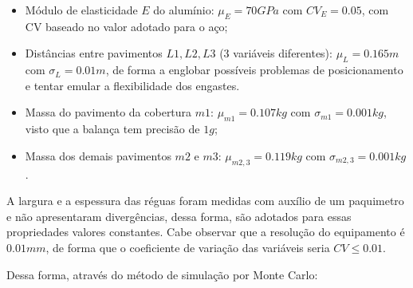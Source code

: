 \begin{itemize}
\item
  Módulo de elasticidade \(E\) do alumínio: \(\mu_E = 70 GPa\) com
  \(CV_E=0.05\), com CV baseado no valor adotado para o aço;
\item
  Distâncias entre pavimentos \(L1, L2, L3\) (3 variáveis diferentes):
  \(\mu_L = 0.165 m\) com \(\sigma_L = 0.01 m\), de forma a englobar
  possíveis problemas de posicionamento e tentar emular a flexibilidade
  dos engastes.
\item
  Massa do pavimento da cobertura \(m1\): \(\mu_{m1} = 0.107 kg\) com
  \(\sigma_{m1} = 0.001 kg\), visto que a balança tem precisão de
  \(1g\);
\item
  Massa dos demais pavimentos \(m2\) e \(m3\): \(\mu_{m2,3} = 0.119 kg\)
  com \(\sigma_{m2,3} = 0.001 kg\).
\end{itemize}

A largura e a espessura das réguas foram medidas com auxílio de um
paquimetro e não apresentaram divergências, dessa forma, são adotados
para essas propriedades valores constantes. Cabe observar que a
resolução do equipamento é \(0.01mm\), de forma que o coeficiente de
variação das variáveis seria $CV \le 0.01 $.

Dessa forma, através do método de simulação por Monte Carlo:

